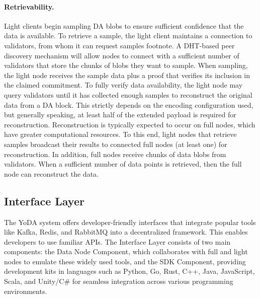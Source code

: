 \documentclass[11pt]{article}
\begin{document}
\paragraph{Retrievability.} Light clients begin sampling DA blobs to ensure sufficient confidence that the data is available. To retrieve a sample, the light client maintains a connection to validators, from whom it can request samples footnote. A DHT-based peer discovery mechanism will allow nodes to connect with a sufficient number of validators that store the chunks of blobs they want to sample. When sampling, the light node receives the sample data plus a proof that verifies its inclusion in the claimed commitment.
%
To fully verify data availability, the light node may query validators until it has collected enough samples to reconstruct the original data from a DA block. This strictly depends on the encoding configuration used, but generally speaking, at least half of the extended payload is required for reconstruction.
%
Reconstruction is typically expected to occur on full nodes, which have greater computational resources. To this end, light nodes that retrieve samples broadcast their results to connected full nodes (at least one) for reconstruction. In addition, full nodes receive chunks of data blobs from validators. When a sufficient number of data points is retrieved, then the full node can reconstruct the data.

\subsection{Interface Layer}
The YoDA system offers developer-friendly interfaces that integrate popular tools like Kafka, Redis, and RabbitMQ into a decentralized framework. This enables developers to use familiar APIs. The Interface Layer consists of two main components: the Data Node Component, which collaborates with full and light nodes to emulate these widely used tools, and the SDK Component, providing development kits in languages such as Python, Go, Rust, C++, Java, JavaScript, Scala, and Unity/C\# for seamless integration across various programming environments.
\end{document}
